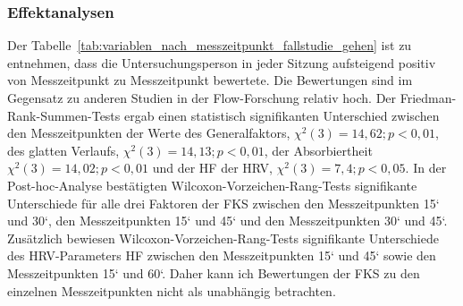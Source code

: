 \subsubsection{Effektanalysen}
Der Tabelle~\ref{tab:variablen_nach_messzeitpunkt_fallstudie_gehen} ist zu entnehmen, dass die Untersuchungsperson in jeder Sitzung aufsteigend positiv von Messzeitpunkt zu Messzeitpunkt bewertete. Die Bewertungen sind im Gegensatz zu anderen Studien in der Flow-Forschung relativ hoch. Der Friedman-Rank-Summen-Tests ergab einen statistisch signifikanten Unterschied zwischen den Messzeitpunkten der Werte des Generalfaktors, $\chi^2 (3) = 14{,}62; p < 0{,}01$, des glatten Verlaufs, $\chi^2 (3) = 14{,}13; p < 0{,}01$, der Absorbiertheit $\chi^2 (3) = 14{,}02; p < 0{,}01$ und der \ac{HF} der \ac{HRV}, $\chi^2 (3) = 7{,}4; p < 0{,}05$. In der Post-hoc-Analyse bestätigten Wilcoxon-Vorzeichen-Rang-Tests signifikante Unterschiede für alle drei Faktoren der \ac{FKS} zwischen den Messzeitpunkten 15‘ und 30‘, den Messzeitpunkten 15‘ und 45‘ und den Messzeitpunkten 30‘ und 45‘. Zusätzlich bewiesen Wilcoxon-Vorzeichen-Rang-Tests signifikante Unterschiede des \ac{HRV}-Parameters \ac{HF} zwischen den Messzeitpunkten 15‘ und 45‘ sowie den Messzeitpunkten 15‘ und 60‘. Daher kann ich Bewertungen der \ac{FKS} zu den einzelnen Messzeitpunkten nicht als unabhängig betrachten.

